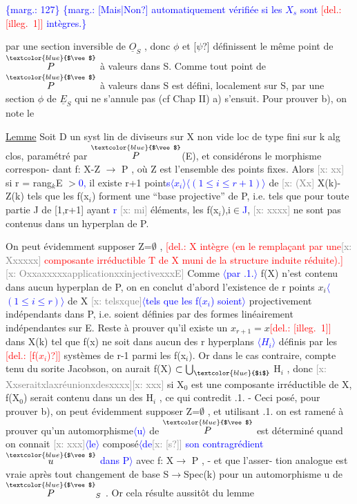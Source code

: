 \documentclass[11pt]{article}
\newcommand{\scanpage}[1]{\par\bigskip\noindent{\small\sffamily[scan #1]}\par}
\newcommand{\mspage}[1]{{\small\sffamily[p.\,#1]}}
\newcommand{\hand}[1]{\textcolor{blue}{#1}}
\let\over\relax
\newcommand{\over}[2]{\textcolor{gray}{#1}\textcolor{blue}{\ensuremath{^{\!\nearrow}}#2}}
\newcommand{\inserted}[2][]{\textcolor{blue}{$\langle$#2$\rangle$}}
\newcommand{\margin}[1]{\textcolor{blue}{\{\textsf{marg.:} #1\}}}
\newcommand{\deleted}[1]{\textcolor{red}{[\textsf{del.:} #1]}}
\newcommand{\xout}[1]{\textcolor{gray}{[\textsf{x:} #1]}}
\newcommand{\uline}[1]{\underline{#1}}
\newcommand{\unsure}[1]{[#1?]}
\newcommand{\illegible}[1]{[\textsf{illeg.\ #1}]}
\begin{document}
\margin{127}
\margin{\unsure{Mais|Non} automatiquement vérifiée si les $X_s$ sont \deleted{\illegible{1}} intègres.}

\clearpage
\scanpage{25/128}
\mspage{31}

par une section inversible de $\underline{O}_S$ , donc $\phi$ et \unsure{$\psi$} définissent le même point
de $\overset{\hand{$\vee$}}{P}$ à valeurs dans S. Comme tout point de $\overset{\hand{$\vee$}}{P}$ à valeurs dans S est défini,
localement sur S, par une section $\phi$ de $\underline{E}_S$ qui ne s'annule pas (cf Chap II)
a) s'ensuit.   Pour prouver b), on note le

\uline{Lemme}   Soit D un syst lin de diviseurs sur X non vide loc de type fini
sur k alg clos, paramétré par $\overset{\hand{$\vee$}}{P}$(E), et considérons le morphisme correspon-%
dant  f: X-Z $\longrightarrow$ P , où Z est l'ensemble des points fixes. Alors \xout{xx} si
r = rang$_k$E $>$\hand{0,} il existe  r+1 point\hand{s}\inserted[typed]{$x_i$}\inserted{$(1\leq i\leq r+1)$} de \xout{(Xx} X(k)-Z(k)  tels que les
f(x$_i$) forment une  ``base projective'' de P, i.e. tels que  pour toute
partie J de [1,r+1] ayant \hand{r} \xout{mi} éléments,  les  f(x$_i$),i$\in$\hand{J}, \xout{xxxx} ne sont pas
contenus dans un hyperplan de P.

On peut évidemment supposer Z=$\emptyset$ , \deleted{X intègre (en le remplaçant
par une\xout{Xxxxxx} composante irréductible T de X muni de la structure induite
réduite).} \xout{OxxaxxxxxapplicationxxinjectivexxxE} Comme \inserted[typed]{par \over{4}{\unsure{3|5}}.1.} f(X) n'est contenu dans
aucun hyperplan de P, on en conclut d'abord l'existence de r points
$x_i$\inserted{$(1\leq i\leq r)$} de X \xout{telsxque}\inserted[typed]{tels que les f($x_i$) soient} projectivement indépendants dans P, i.e. soient définies
par des formes linéairement indépendantes sur E.   Reste à prouver qu'il
existe un  $x_{r+1} = x$\deleted{\illegible{1}}   dans X(k) tel que  f(x) ne soit dans aucun des r
hyperplans \inserted{$H_i$} définis par les \deleted{\unsure{f($x_i$)}} systèmes de r-1 parmi les f(x$_i$). Or dans
le cas contraire, compte tenu du sorite Jacobson,  on aurait
f(X) $\subset \bigcup_{\hand{$i$}}$ H$_i$ , donc \xout{Xxseraitxlaxréunionxdesxxxx}\xout{xxx} si X$_0$  est une composante
irréductible de X, f(X$_0$) serait contenu dans un des H$_i$ , ce qui contredit
\over{\unsure{4}}{\unsure{3|5}}.1. - Ceci posé,  pour prouver b), on peut  évidemment supposer Z=$\emptyset$ ,
et utilisant \over{\unsure{4}}{\unsure{3|5}}.1.  on est ramené à prouver qu'un automorphisme\inserted{u} de $\overset{\hand{$\vee$}}{P}$ est
déterminé quand on connait \xout{xxx}\inserted[typed]{le} composé\inserted[typed]{de\xout{\unsure{s}} son contragrédient $\overset{\hand{$\vee$}}{u}$ dans P} avec f: X$\longrightarrow$ P , - et que l'asser-%
tion analogue est vraie après tout changement de base S$\rightarrow$Spec(k)
pour un  automorphisme u de $\overset{\hand{$\vee$}}{P}_S$  .  Or cela résulte aussitôt  du lemme
\end{document}
